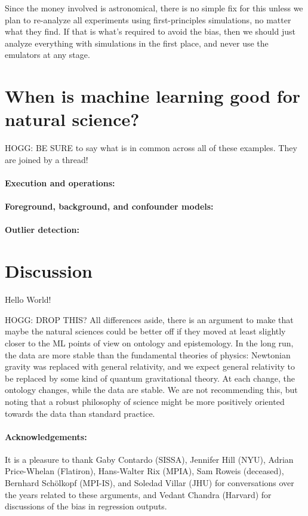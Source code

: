 \documentclass[11pt]{article}
\begin{document}
Since the money involved is astronomical, there is no simple fix for this unless we plan to re-analyze all experiments using first-principles simulations, no matter what they find.
If that is what's required to avoid the bias, then we should just analyze everything with simulations in the first place, and never use the emulators at any stage.

\section{When is machine learning good for natural science?}\label{sec:good}
HOGG: BE SURE to say what is in common across all of these examples. They are joined by a thread!

\paragraph{Execution and operations:}

\paragraph{Foreground, background, and confounder models:}

\paragraph{Outlier detection:}

\section{Discussion}\label{sec:discussion}

Hello World!

HOGG: DROP THIS? All differences aside, there is an argument to make that maybe the natural sciences could be better off if they moved at least slightly closer to the ML points of view on ontology and epistemology.
In the long run, the data are more stable than the fundamental theories of physics:
Newtonian gravity was replaced with general relativity, and we expect general relativity to be replaced by some kind of quantum gravitational theory.
At each change, the ontology changes, while the data are stable.
We are not recommending this, but noting that a robust philosophy of science might be more positively oriented towards the data than standard practice.

\paragraph{Acknowledgements:}
It is a pleasure to thank
  Gaby Contardo (SISSA),
  Jennifer Hill (NYU),
  Adrian Price-Whelan (Flatiron),
  Hans-Walter Rix (MPIA),
  Sam Roweis (deceased),
  Bernhard Sch\"olkopf (MPI-IS), and
  Soledad Villar (JHU)
for conversations over the years related to these arguments, and
  Vedant Chandra (Harvard)
for discussions of the bias in regression outputs.
\end{document}
